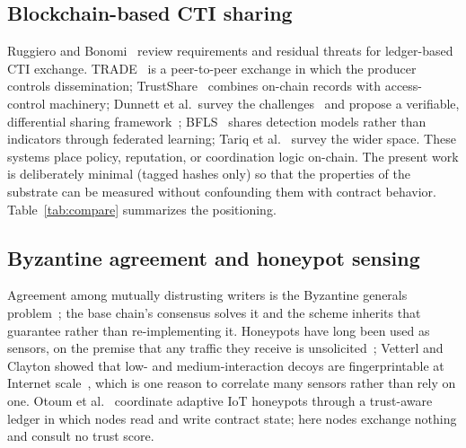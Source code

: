 \documentclass[conference]{IEEEtran}
\begin{document}
\subsection{Blockchain-based CTI sharing}
Ruggiero and Bonomi~\cite{ref4} review requirements and residual threats for ledger-based CTI exchange. TRADE~\cite{ref5} is a peer-to-peer exchange in which the producer controls dissemination; TrustShare~\cite{ref6} combines on-chain records with access-control machinery; Dunnett et al.\ survey the challenges~\cite{ref9} and propose a verifiable, differential sharing framework~\cite{ref7}; BFLS~\cite{ref10} shares detection models rather than indicators through federated learning; Tariq et al.~\cite{ref11} survey the wider space. These systems place policy, reputation, or coordination logic on-chain. The present work is deliberately minimal (tagged hashes only) so that the properties of the substrate can be measured without confounding them with contract behavior. Table~\ref{tab:compare} summarizes the positioning.

\subsection{Byzantine agreement and honeypot sensing}
Agreement among mutually distrusting writers is the Byzantine generals problem~\cite{ref12}; the base chain's consensus solves it and the scheme inherits that guarantee rather than re-implementing it. Honeypots have long been used as sensors, on the premise that any traffic they receive is unsolicited~\cite{ref13,ref14}; Vetterl and Clayton showed that low- and medium-interaction decoys are fingerprintable at Internet scale~\cite{ref15}, which is one reason to correlate many sensors rather than rely on one. Otoum et al.~\cite{ref16} coordinate adaptive IoT honeypots through a trust-aware ledger in which nodes read and write contract state; here nodes exchange nothing and consult no trust score.
\end{document}
